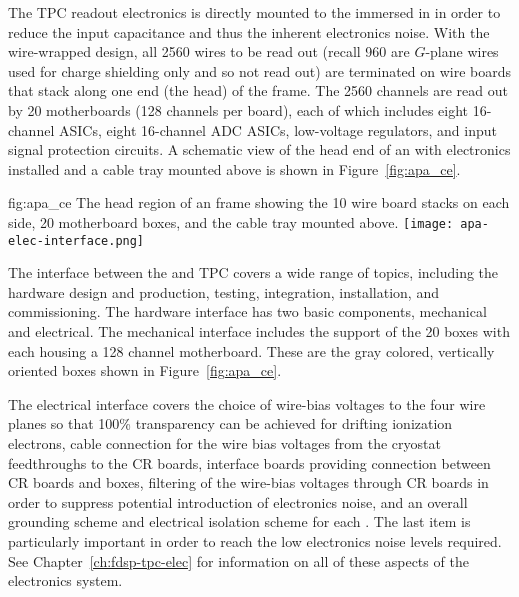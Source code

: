 The TPC readout electronics is directly mounted to the  immersed in \lar in order to reduce the input capacitance and thus the inherent electronics noise.  With the wire-wrapped design, all \num{2560} wires to be read out (recall \num{960} are $G$-plane wires used for charge shielding only and so not read out) are terminated on wire boards that stack along one end (the head) of the  frame.  The \num{2560} channels are read out by \num{20}  motherboards (\num{128} channels per board), each of which includes eight \num{16}-channel  ASICs, eight \num{16}-channel ADC ASICs, low-voltage regulators, and input signal protection circuits.  A schematic view of the head end of an  with electronics installed and a cable tray mounted above is shown in Figure~\ref{fig:apa_ce}. 

\begin{dunefigure}{fig:apa_ce}
{The head region of an  frame showing the 10 wire board stacks on each side, \num{20}  motherboard boxes, and the cable tray mounted above.}
\texttt{[image: apa-elec-interface.png]}
\end{dunefigure}

The interface between the  and TPC  covers a wide range of topics, including the hardware design and production, testing, integration, installation, and commissioning. The hardware interface has two basic components, mechanical and electrical. The mechanical interface includes the support of the \num{20}  boxes with each housing a \num{128} channel  motherboard.  These are the gray colored, vertically oriented boxes shown in Figure~\ref{fig:apa_ce}. 

The electrical interface covers the choice of wire-bias voltages to the four wire planes so that \num{100}\% transparency can be achieved for drifting ionization electrons, cable connection for the wire bias voltages from the cryostat feedthroughs to the CR boards, interface boards providing connection between CR boards and  boxes, filtering of the wire-bias voltages through CR boards in order to suppress potential introduction of electronics noise, and an overall grounding scheme and electrical isolation scheme for each . The last item is particularly important in order to reach the low electronics noise levels required.  See Chapter~\ref{ch:fdsp-tpc-elec} for information on all of these aspects of the  electronics system.


